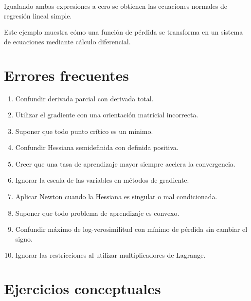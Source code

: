 \documentclass[
  spanish,
  10.5pt,
  letterpaper,
  DIV=11,
  numbers=noendperiod,
  oneside,
  open=any]{scrreprt}
\providecommand{\tightlist}{%
  \setlength{\itemsep}{0pt}\setlength{\parskip}{0pt}}
\theoremstyle{definition}
\theoremstyle{definition}
\theoremstyle{plain}
\theoremstyle{remark}
\begin{document}
Igualando ambas expresiones a cero se obtienen las ecuaciones normales
de regresión lineal simple.

Este ejemplo muestra cómo una función de pérdida se transforma en un
sistema de ecuaciones mediante cálculo diferencial.

\section*{Errores frecuentes}\label{errores-frecuentes-3}


\begin{enumerate}
\def\labelenumi{\arabic{enumi}.}
\tightlist
\item
  Confundir derivada parcial con derivada total.
\item
  Utilizar el gradiente con una orientación matricial incorrecta.
\item
  Suponer que todo punto crítico es un mínimo.
\item
  Confundir Hessiana semidefinida con definida positiva.
\item
  Creer que una tasa de aprendizaje mayor siempre acelera la
  convergencia.
\item
  Ignorar la escala de las variables en métodos de gradiente.
\item
  Aplicar Newton cuando la Hessiana es singular o mal condicionada.
\item
  Suponer que todo problema de aprendizaje es convexo.
\item
  Confundir máximo de log-verosimilitud con mínimo de pérdida sin
  cambiar el signo.
\item
  Ignorar las restricciones al utilizar multiplicadores de Lagrange.
\end{enumerate}

\section*{Ejercicios conceptuales}\label{ejercicios-conceptuales-3}

\end{document}
